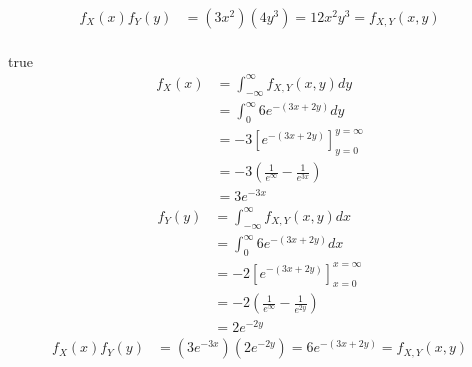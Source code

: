 \documentclass[12pt,border=4pt,multi]{article} %
\begin{document}
\begin{align*}
f_X(x)f_Y(y) &= (3x^2)(4y^3) = 12x^2 y^3 = f_{X, Y}(x, y)
\end{align*}
\newpage
{}\\
true
\begin{align*}
f_X(x) &= \int_{-\infty}^{\infty} f_{X, Y}(x, y) dy\\
&= \int_{0}^{\infty} 6e^{-(3x + 2y)} dy\\
&= -3[e^{-(3x + 2y)}]_{y = 0}^{y = \infty}\\
&= -3(\frac{1}{e^{\infty}} - \frac{1}{e^{3x}})\\
&= 3e^{-3x}
\end{align*}
\begin{align*}
f_Y(y) &= \int_{-\infty}^{\infty} f_{X, Y}(x, y) dx\\
&= \int_{0}^{\infty} 6e^{-(3x + 2y)} dx\\
&= -2[e^{-(3x + 2y)}]_{x = 0}^{x = \infty}\\
&= -2(\frac{1}{e^\infty} - \frac{1}{e^{2y}})\\
&= 2e^{-2y}
\end{align*}
\begin{align*}
f_X(x)f_Y(y) &= (3e^{-3x})(2e^{-2y}) = 6e^{-(3x + 2y)} = f_{X, Y}(x, y)
\end{align*}
\end{document}
